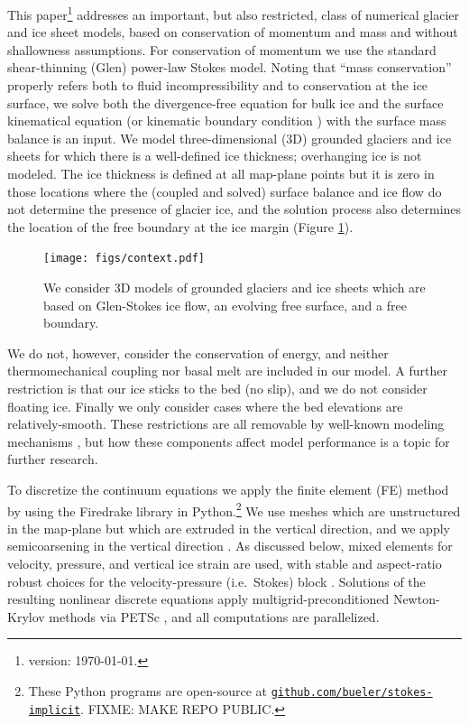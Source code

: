 \documentclass[letterpaper,final,12pt,reqno]{amsart}
\begin{document}
This paper\footnote{version: \today.} addresses an important, but also restricted, class of numerical glacier and ice sheet models, based on conservation of momentum and mass and without shallowness assumptions.  For conservation of momentum we use the standard shear-thinning (Glen) power-law Stokes model.  Noting that ``mass conservation'' properly refers both to fluid incompressibility and to conservation at the ice surface, we solve both the divergence-free equation for bulk ice and the surface kinematical equation (or kinematic boundary condition \cite{GreveBlatter2009}) with the surface mass balance is an input.  We model three-dimensional (3D) grounded glaciers and ice sheets for which there is a well-defined ice thickness; overhanging ice is not modeled.  The ice thickness is defined at all map-plane points but it is zero in those locations where the (coupled and solved) surface balance and ice flow do not determine the presence of glacier ice, and the solution process also determines the location of the free boundary at the ice margin \cite{SchoofHewitt2013} (Figure \ref{fig:context}).

\begin{figure}[ht]
\begin{center}
\texttt{[image: figs/context.pdf]}
\end{center}
\caption{We consider 3D models of grounded glaciers and ice sheets which are based on Glen-Stokes ice flow, an evolving free surface, and a free boundary.}
\label{fig:context}
\end{figure}

We do not, however, consider the conservation of energy, and neither thermomechanical coupling nor basal melt are included in our model.  A further restriction is that our ice sticks to the bed (no slip), and we do not consider floating ice.  Finally we only consider cases where the bed elevations are relatively-smooth.  These restrictions are all removable by well-known modeling mechanisms \cite[for example]{Aschwandenetal2012,Winkelmannetal2011}, but how these components affect model performance is a topic for further research.

To discretize the continuum equations we apply the finite element (FE) method \cite{Elmanetal2014} by using the Firedrake library \cite{Rathgeberetal2016} in Python.\footnote{These Python programs are open-source at \href{https://github.com/bueler/stokes-implicit}{\texttt{github.com/bueler/stokes-implicit}}.  FIXME: MAKE REPO PUBLIC.}  We use meshes which are unstructured in the map-plane but which are extruded \cite{Gibsonetal2019} in the vertical direction, and we apply semicoarsening in the vertical direction \cite{Tuminaroetal2016}.  As discussed below, mixed elements for velocity, pressure, and vertical ice strain are used, with stable and aspect-ratio robust choices for the velocity-pressure (i.e.~Stokes) block \cite{Elmanetal2014}.  Solutions of the resulting nonlinear discrete equations apply multigrid-preconditioned Newton-Krylov methods \cite{Bueler2021} via PETSc \cite{Balayetal2020}, and all computations are parallelized.
\end{document}
